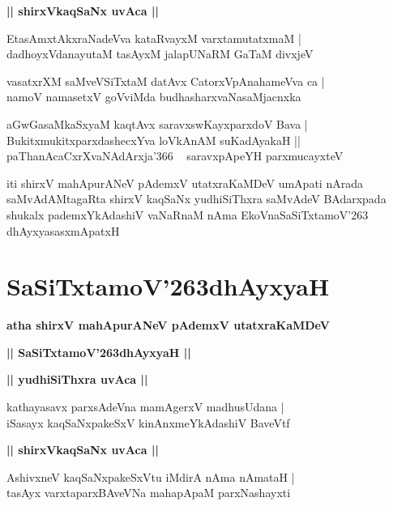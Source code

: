 \documentclass[twoside,12pt,openright]{book}
\def\S{\char'263}
\newcounter{shloka}[chapter]
\def\uvaca#1{\centerline{{\large\textbf{#1}}}}
\begin{document}
\uvaca{|| shirxVkaqSaNx uvAca ||}

\begin{shloka}%
EtasAmxtAkxraNadeVva kataRvayxM varxtamutatxmaM |\\
dadhoyxVdanayutaM tasAyxM jalapUNaRM GaTaM divxjeV 
\end{shloka}

\begin{shloka}%
vasatxrXM saMveVSiTxtaM datAvx CatorxVpAnahameVva ca |\\
namoV namasetxV goVviMda budhasharxvaNasaMjacnxka
\end{shloka}

\begin{shloka}%
aGwGasaMkaSxyaM kaqtAvx saravxswKayxparxdoV Bava |\\
BukitxmukitxparxdashecxYva loVkAnAM suKadAyakaH ||\\
paThanAcaCxrXvaNAdArxja\char'366 ~ saravxpApeYH parxmucayxteV 
\end{shloka}

\begin{center}
iti shirxV mahApurANeV pAdemxV utatxraKaMDeV umApati nArada saMvAdAMtagaRta shirxV kaqSaNx 
yudhiSiThxra saMvAdeV BAdarxpada shukalx pademxYkAdashiV vaNaRnaM nAma EkoVnaSaSiTxtamoV\S 
dhAyxyasasxmApatxH
\end{center}

\chapter{SaSiTxtamoV\S dhAyxyaH}

\begin{center}
{\LARGE\bfseries atha shirxV mahApurANeV pAdemxV utatxraKaMDeV}
\end{center}

\begin{center}
{\LARGE\bfseries || SaSiTxtamoV\S dhAyxyaH ||}
\end{center}

\uvaca{|| yudhiSiThxra uvAca ||}

\begin{shloka}%
kathayasavx parxsAdeVna mamAgerxV madhusUdana |\\
iSasayx kaqSaNxpakeSxV kinAnxmeYkAdashiV BaveVtf 
\end{shloka}

\uvaca{|| shirxVkaqSaNx uvAca ||}

\begin{shloka}%
AshivxneV kaqSaNxpakeSxVtu iMdirA nAma nAmataH |\\
tasAyx varxtaparxBAveVNa mahapApaM parxNashayxti
\end{shloka}
\end{document}
